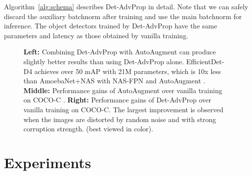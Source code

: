 \documentclass[final]{cvpr}
\begin{document}
Algorithm~\ref{alg:schema} describes Det-AdvProp in detail.
Note that we can safely discard the auxiliary batchnorm after training and use the main batchnorm for inference. The object detectors trained by Det-AdvProp have the same parameters and latency as those obtained by vanilla training.

































\begin{figure*}[!htb]
\centering
{}
\caption{\textbf{Left:} Combining Det-AdvProp with AutoAugment \cite{zoph2019learning} can produce slightly better results than using Det-AdvProp alone.
EfficientDet-D4 achieves over 50 mAP with 21M parameters, which is 10x less than AmoebaNet+NAS with NAS-FPN \cite{ghiasi2019nasfpn} and AutoAugment \cite{zoph2019learning}.
\textbf{Middle:} Performance gains of AutoAugment over vanilla training on COCO-C \cite{michaelis2020benchmarking}.
\textbf{Right:} Performance gains of Det-AdvProp over vanilla training on COCO-C. The largest improvement is observed when the images are distorted by random noise and with strong corruption strength.
(best viewed in color).}
\vspace{-12pt}
\end{figure*}

\section{Experiments}
\end{document}
